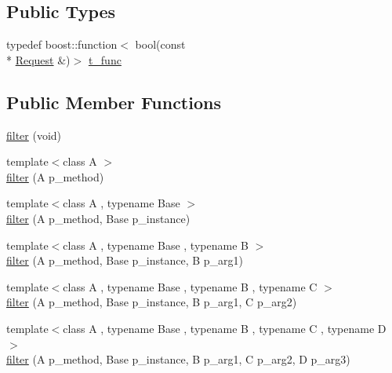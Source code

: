 \subsection*{Public Types}
\begin{DoxyCompactItemize}
\item 
typedef boost\-::function$<$ bool(const \\*
\hyperlink{classxtd_1_1network_1_1http_1_1Request}{Request} \&)$>$ \hyperlink{structxtd_1_1network_1_1http_1_1Server_1_1Handler_1_1filter_a9eae862874b2dfece23fb42bf772110a}{t\-\_\-func}
\end{DoxyCompactItemize}
\subsection*{Public Member Functions}
\begin{DoxyCompactItemize}
\item 
\hyperlink{structxtd_1_1network_1_1http_1_1Server_1_1Handler_1_1filter_a171eada6407b5288b236f1cefb241f28}{filter} (void)
\item 
{\footnotesize template$<$class A $>$ }\\\hyperlink{structxtd_1_1network_1_1http_1_1Server_1_1Handler_1_1filter_a91e11defbce3a488c133f522d5260968}{filter} (A p\-\_\-method)
\item 
{\footnotesize template$<$class A , typename Base $>$ }\\\hyperlink{structxtd_1_1network_1_1http_1_1Server_1_1Handler_1_1filter_a9624211d3c2a2ddd597dc3675b1def90}{filter} (A p\-\_\-method, Base p\-\_\-instance)
\item 
{\footnotesize template$<$class A , typename Base , typename B $>$ }\\\hyperlink{structxtd_1_1network_1_1http_1_1Server_1_1Handler_1_1filter_ac1de4abefeb03fdf3cd77d7bab7c8a99}{filter} (A p\-\_\-method, Base p\-\_\-instance, B p\-\_\-arg1)
\item 
{\footnotesize template$<$class A , typename Base , typename B , typename C $>$ }\\\hyperlink{structxtd_1_1network_1_1http_1_1Server_1_1Handler_1_1filter_af69ce7c9bd25129a2c26f9fdbb1df1a0}{filter} (A p\-\_\-method, Base p\-\_\-instance, B p\-\_\-arg1, C p\-\_\-arg2)
\item 
{\footnotesize template$<$class A , typename Base , typename B , typename C , typename D $>$ }\\\hyperlink{structxtd_1_1network_1_1http_1_1Server_1_1Handler_1_1filter_a3e6d0855bbfd61e419cd3e5ffce0c9ea}{filter} (A p\-\_\-method, Base p\-\_\-instance, B p\-\_\-arg1, C p\-\_\-arg2, D p\-\_\-arg3)

\end{DoxyCompactItemize}
